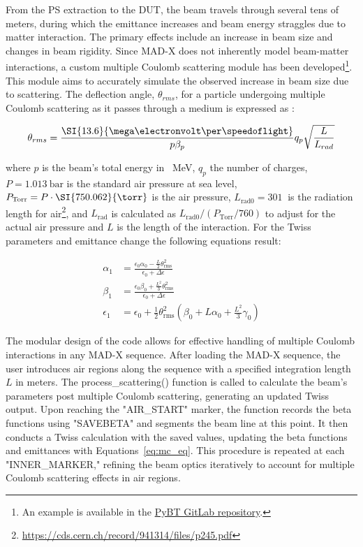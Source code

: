 \documentclass[a4paper,
               biblatex,     %
               ]{jacow}
\begin{document}
From the PS extraction to the DUT, the beam travels through several tens of meters, during which the emittance increases and beam energy straggles due to matter interaction. The primary effects include an increase in beam size and changes in beam rigidity. Since MAD-X does not inherently model beam-matter interactions, a custom multiple Coulomb scattering module has been developed\footnote{An example is available in the \href{https://gitlab.cern.ch/abt-optics-and-code-repository/simulation-codes/pybt/-/blob/master/pybt/examples/example_air_scattering.ipynb}{PyBT GitLab repository}.}. This module aims to accurately simulate the observed increase in beam size due to scattering. The deflection angle, $\theta_{rms}$, for a particle undergoing multiple Coulomb scattering as it passes through a medium is expressed as  \cite{muller_description_2001}:

\[
\theta_{rms} = \frac{\SI{13.6}{\mega\electronvolt\per\speedoflight}}{p\beta_{p}}q_{p}\sqrt\frac{L}{L_{rad}}\]

where $p$ is the beam's total energy in \SI{}{\mega\electronvolt}, $q_{p}$ the number of charges, $P=\SI{1.013}{\bar}$ is the standard air pressure at sea level, $P_{\text{Torr}}=P\cdot\SI{750.062}{\torr}$ is the air pressure, $L_{\text{rad0}}=\SI{301}{}$ is the radiation length for air\footnote{\href{https://cds.cern.ch/record/941314/files/p245.pdf}{{https://cds.cern.ch/record/941314/files/p245.pdf}}}, and $L_{\text{rad}}$ is calculated as $L_{\text{rad0}}/(P_{\text{Torr}}/760)$ to adjust for the actual air pressure and $L$ is the length of the interaction. For the Twiss parameters and emittance change the following equations result:


\begin{equation}
\label{eq:mc_eq}
\begin{aligned}
\alpha_{1} &= \frac{\epsilon_0 \alpha_0 - \frac{L}{2} \theta_{\text{rms}}^2}{\epsilon_0 + \Delta \epsilon}\\
\beta_{1} &= \frac{\epsilon_0 \beta_0 + \frac{L^2}{3} \theta_{\text{rms}}^2}{\epsilon_0 + \Delta \epsilon}\\
\epsilon_{1} &= \epsilon_0 + \frac{1}{2} \theta_{\text{rms}}^2 \left( \beta_0 + L \alpha_0 + \frac{L^2}{3} \gamma_0 \right)
\end{aligned}
\end{equation}

The modular design of the code allows for effective handling of multiple Coulomb interactions in any MAD-X sequence. After loading the MAD-X sequence, the user introduces air regions along the sequence with a specified integration length $L$ in meters. The process\_scattering() function is called to calculate the beam's parameters post multiple Coulomb scattering, generating an updated Twiss output. Upon reaching the "AIR\_START" marker, the function records the beta functions using "SAVEBETA" and segments the beam line at this point. It then conducts a Twiss calculation with the saved values, updating the beta functions and emittances with Equations~\ref{eq:mc_eq}. This procedure is repeated at each "INNER\_MARKER," refining the beam optics iteratively to account for multiple Coulomb scattering effects in air regions.
\end{document}
